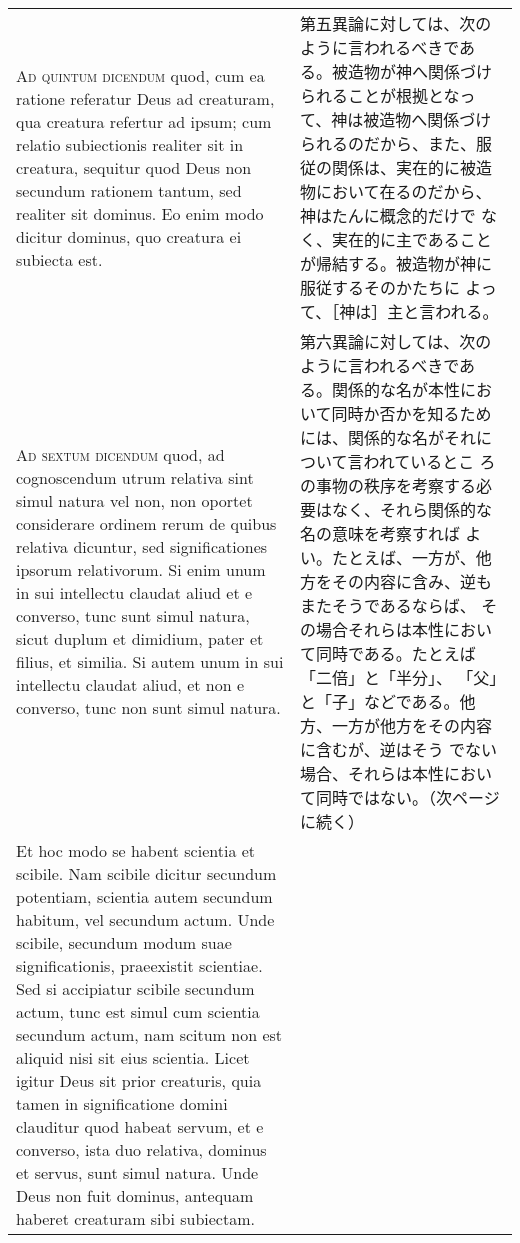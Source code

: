 \documentclass[10pt]{jsarticle} %
\begin{document}
\begin{longtable}{p{21em}p{21em}}
\\


{\scshape Ad quintum dicendum} quod, cum ea ratione referatur Deus ad
creaturam, qua creatura refertur ad ipsum; cum relatio subiectionis
realiter sit in creatura, sequitur quod Deus non secundum rationem
tantum, sed realiter sit dominus. Eo enim modo dicitur dominus, quo
creatura ei subiecta est.


&

第五異論に対しては、次のように言われるべきである。被造物が神へ関係づけ
られることが根拠となって、神は被造物へ関係づけられるのだから、また、服
従の関係は、実在的に被造物において在るのだから、神はたんに概念的だけで
なく、実在的に主であることが帰結する。被造物が神に服従するそのかたちに
よって、［神は］主と言われる。

\\



{\scshape Ad sextum dicendum} quod, ad cognoscendum utrum relativa
sint simul natura vel non, non oportet considerare ordinem rerum de
quibus relativa dicuntur, sed significationes ipsorum relativorum. Si
enim unum in sui intellectu claudat aliud et e converso, tunc sunt
simul natura, sicut duplum et dimidium, pater et filius, et
similia. Si autem unum in sui intellectu claudat aliud, et non e
converso, tunc non sunt simul natura. 

&

第六異論に対しては、次のように言われるべきである。関係的な名が本性にお
いて同時か否かを知るためには、関係的な名がそれについて言われているとこ
ろの事物の秩序を考察する必要はなく、それら関係的な名の意味を考察すれば
よい。たとえば、一方が、他方をその内容に含み、逆もまたそうであるならば、
その場合それらは本性において同時である。たとえば「二倍」と「半分」、
「父」と「子」などである。他方、一方が他方をその内容に含むが、逆はそう
でない場合、それらは本性において同時ではない。（次ページに続く）

\\

Et hoc modo se habent scientia
et scibile. Nam scibile dicitur secundum potentiam, scientia autem
secundum habitum, vel secundum actum. Unde scibile, secundum modum
suae significationis, praeexistit scientiae. Sed si accipiatur scibile
secundum actum, tunc est simul cum scientia secundum actum, nam scitum
non est aliquid nisi sit eius scientia. Licet igitur Deus sit prior
creaturis, quia tamen in significatione domini clauditur quod habeat
servum, et e converso, ista duo relativa, dominus et servus, sunt
simul natura. Unde Deus non fuit dominus, antequam haberet creaturam
sibi subiectam.



\end{longtable}
\end{document}
